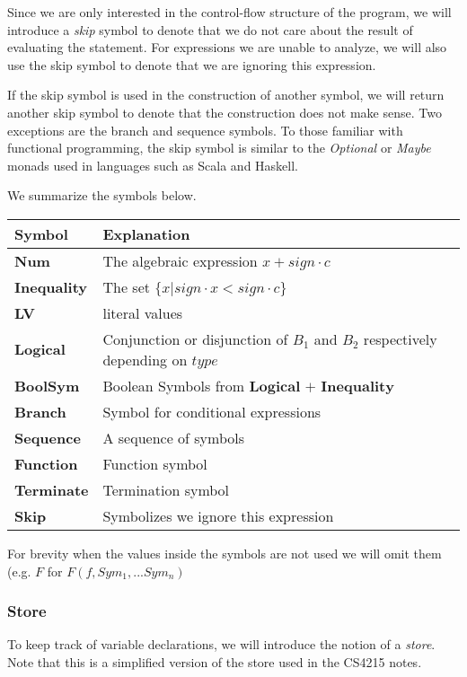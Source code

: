 Since we are only interested in the control-flow structure of the program, we will introduce a {\it skip} symbol to denote that we do not care about the result of evaluating the statement. For expressions we are unable to analyze, we will also use the skip symbol to denote that we are ignoring this expression.

If the skip symbol is used in the construction of another symbol, we will return another skip symbol to denote that the construction does not make sense. Two exceptions are the branch and sequence symbols. To those familiar with functional programming, the skip symbol is similar to the {\it Optional} or {\it Maybe} monads used in languages such as Scala and Haskell.

We summarize the symbols below.

\begin{center}
\begin{tabular}{|l|l|} \hline 
Symbol & Explanation\\ \hline
\textbf{Num} & The algebraic expression $x+sign\cdot c$\\
\textbf{Inequality} & The set $\{x|sign\cdot x<sign\cdot c\}$ \\ 
\textbf{LV} & literal values\\ 
\textbf{Logical}  & Conjunction or disjunction of $B_1$ and $B_2$ respectively depending on $type$  \\ 
\textbf{BoolSym} & Boolean Symbols from $\textbf{Logical + Inequality}$\\ 
\textbf{Branch}  & Symbol for conditional expressions \\ 
\textbf{Sequence} & A sequence of symbols \\ 
\textbf{Function} & Function symbol \\ 
\textbf{Terminate} & Termination symbol \\ 
  \textbf{Skip} & Symbolizes we ignore this expression \\
  \hline
\end{tabular}
\end{center}

For brevity when the values inside the symbols are not used we will omit them
(e.g. $F$ for $F(f,Sym_1,...Sym_n)$

\subsubsection{Store}
To keep track of variable declarations, we will introduce the notion of a {\it store}. Note that this is a simplified version of the store used in the CS4215 notes.

